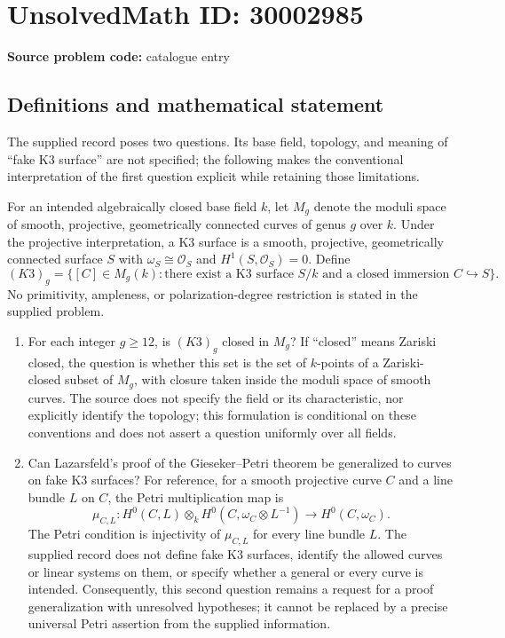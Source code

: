 \documentclass[11pt]{article}
\begin{document}
\section*{UnsolvedMath ID: 30002985}
\textbf{Source problem code:} catalogue entry
\subsection{Definitions and mathematical statement}
The supplied record poses two questions. Its base field, topology, and meaning of ``fake K3 surface'' are not specified; the following makes the conventional interpretation of the first question explicit while retaining those limitations.

For an intended algebraically closed base field \(k\), let \(M_g\) denote the moduli space of smooth, projective, geometrically connected curves of genus \(g\) over \(k\). Under the projective interpretation, a K3 surface is a smooth, projective, geometrically connected surface \(S\) with \(\omega_S\cong\mathcal O_S\) and \(H^1(S,\mathcal O_S)=0\). Define
\[
(K3)_g=\bigl\{[C]\in M_g(k):\text{there exist a K3 surface }S/k\text{ and a closed immersion }C\hookrightarrow S\bigr\}.
\]
No primitivity, ampleness, or polarization-degree restriction is stated in the supplied problem.

\begin{enumerate}
\item For each integer \(g\geq12\), is \((K3)_g\) closed in \(M_g\)? If ``closed'' means Zariski closed, the question is whether this set is the set of \(k\)-points of a Zariski-closed subset of \(M_g\), with closure taken inside the moduli space of smooth curves. The source does not specify the field or its characteristic, nor explicitly identify the topology; this formulation is conditional on these conventions and does not assert a question uniformly over all fields.
\item Can Lazarsfeld's proof of the Gieseker--Petri theorem be generalized to curves on fake K3 surfaces? For reference, for a smooth projective curve \(C\) and a line bundle \(L\) on \(C\), the Petri multiplication map is
\[
\mu_{C,L}:H^0(C,L)\otimes_k H^0(C,\omega_C\otimes L^{-1})\longrightarrow H^0(C,\omega_C).
\]
The Petri condition is injectivity of \(\mu_{C,L}\) for every line bundle \(L\). The supplied record does not define fake K3 surfaces, identify the allowed curves or linear systems on them, or specify whether a general or every curve is intended. Consequently, this second question remains a request for a proof generalization with unresolved hypotheses; it cannot be replaced by a precise universal Petri assertion from the supplied information.
\end{enumerate}
\end{document}
